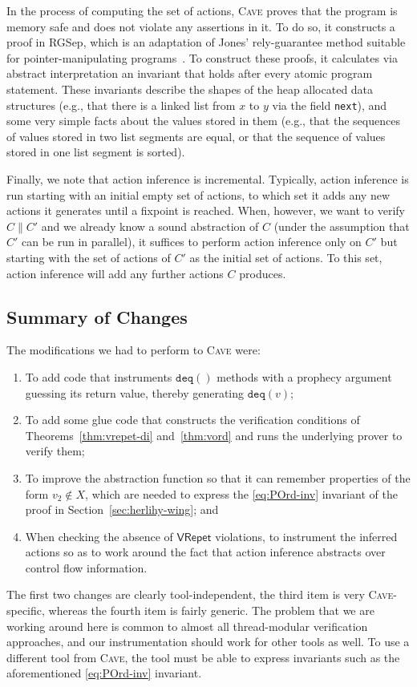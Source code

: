 \documentclass{LMCS}
\newcommand{\deq}{\ensuremath{\mathtt{deq}}}
\newcommand{\VRepet}{\ensuremath{\mathsf{VRepet}}}
\begin{document}
In the process of computing the set of actions, \textsc{Cave} 
proves that the program is memory safe and does not violate any 
assertions in it. To do so, it constructs a proof in RGSep, which is an
adaptation of Jones' rely-guarantee method suitable for pointer-manipulating 
programs~\cite{Jon1983,VP2007}. 
To construct these proofs, it calculates via abstract interpretation
an invariant that holds after every atomic program statement.
These invariants describe the shapes of the heap allocated data structures
(e.g., that there is a linked list from $x$ to $y$ via the field \texttt{next}),
and some very simple facts about the values stored in them 
(e.g., that the sequences of values stored in two list segments are equal,
or that the sequence of values stored in one list segment is sorted).

Finally, we note that action inference is incremental. Typically, action inference 
is run starting with an initial empty set of actions, to which set it adds any new
actions it generates until a fixpoint is reached. 
When, however, we want to verify $C\|C'$ and we already know a sound 
abstraction of $C$ (under the assumption that $C'$ can be run in parallel), 
it suffices to perform action inference only on $C'$ but starting with the 
set of actions of $C'$ as the initial set of actions.
To this set, action inference will add any further actions $C$ produces.





\subsection*{Summary of Changes}

The modifications we had to perform to \textsc{Cave} were:
\begin{enumerate}
\item To add code that instruments $\deq()$ methods with a prophecy argument
guessing its return value, thereby generating $\deq(v)$;
\item To add some glue code that constructs the verification conditions of
Theorems~\ref{thm:vrepet-di} and~\ref{thm:vord} and runs the 
underlying prover to verify them;
\item To improve the abstraction function so that it can remember properties of the
form $v_2 \notin X$, which are needed to express the \eqref{eq:POrd-inv} invariant
of the proof in Section~\ref{sec:herlihy-wing}; and
\item When checking the absence of $\VRepet$ violations, 
to instrument the inferred actions so as to work around the fact 
that action inference abstracts over control flow information.
\end{enumerate}
The first two changes are clearly tool-independent, the third item is 
very \textsc{Cave}-specific, whereas the fourth item is fairly generic. 
The problem that we are working around here is common to almost
all thread-modular verification approaches, and our instrumentation 
should work for other tools as well.  
To use a different tool from \textsc{Cave}, the tool must be able to express 
invariants such as the aforementioned \eqref{eq:POrd-inv} invariant.
\end{document}
